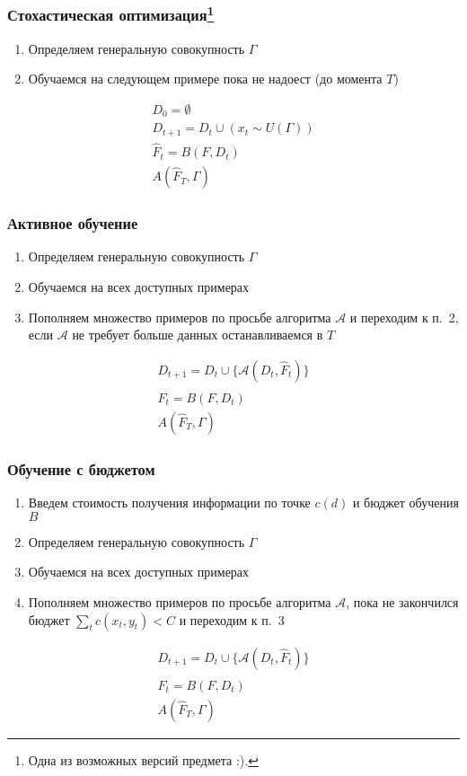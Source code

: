 \documentclass[14pt, fleqn, xcolor={dvipsnames, table}]{beamer}
\begin{document}
\begin{frame}
\frametitle{Стохастическая оптимизация\footnote{Одна из возможных версий предмета :).}}
\begin{enumerate}
	\item Определяем генеральную совокупность $\Gamma$
	\item Обучаемся на следующем примере пока не надоест (до момента $T$)
\end{enumerate}
$$\begin{array}{l}
D_0 = \emptyset \\
D_{t+1} = D_{t} \cup \left(x_t \sim U(\Gamma)\right) \\
\hat{F}_t=B(F, D_t) \\
A(\hat{F}_T, \Gamma)
\end{array}$$
\end{frame}

\begin{frame}
\frametitle{Активное обучение}
\begin{enumerate}
	\item Определяем генеральную совокупность $\Gamma$
	\item Обучаемся на всех доступных примерах
	\item Пополняем множество примеров по просьбе алгоритма $\mathcal{A}$ и переходим к п.~2, если $\mathcal{A}$ не требует больше данных останавливаемся в $T$
\end{enumerate}
$$\begin{array}{l}
D_{t+1} = D_{t} \cup \{\mathcal{A}(D_t, \hat{F}_t)\} \\
\hat{F}_t = B(F, D_{t}) \\
A(\hat{F}_T, \Gamma)
\end{array}$$
\end{frame}

\begin{frame}
\frametitle{Обучение с бюджетом}
\begin{enumerate}
	\item Введем стоимость получения информации по точке $c(d)$ и бюджет обучения $B$
	\item Определяем генеральную совокупность $\Gamma$
	\item Обучаемся на всех доступных примерах
	\item Пополняем множество примеров по просьбе алгоритма $\mathcal{A}$, пока не закончился бюджет $\sum_t c({x_t, y_t}) < C$ и переходим к п.~3
\end{enumerate}
$$\begin{array}{l}
D_{t+1} = D_{t} \cup \{\mathcal{A}(D_t, \hat{F}_t)\} \\
\hat{F}_t = B(F, D_{t}) \\
A(\hat{F}_T, \Gamma)
\end{array}$$
\end{frame}
\end{document}
